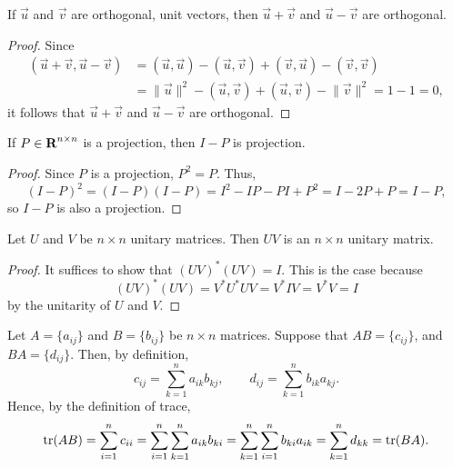 \documentclass{homework}
\begin{document}
	\maketitle
	
	\question If $\vec{u}$ and $\vec{v}$ are orthogonal, unit vectors, then $\vec{u} + \vec{v}$ and $\vec{u} - \vec{v}$ are orthogonal.
	
	\begin{proof}
		Since
		\begin{align*}
			(\vec{u}+\vec{v}, \vec{u} - \vec{v}) &= (\vec{u},\vec{u}) - (\vec{u}, \vec{v}) + (\vec{v},\vec{u}) - (\vec{v},\vec{v})\\
			&= \lVert \vec{u}\rVert^2 - (\vec{u}, \vec{v}) + (\vec{u}, \vec{v}) - \lVert \vec{v}\rVert^2 = 1-1 =0,
		\end{align*}
		it follows that $\vec{u} + \vec{v}$ and $\vec{u} - \vec{v}$ are orthogonal.
	\end{proof}
	
	\question If $P \in \textnormal{\bf R}^{n\times n}$ is a projection, then $I-P$ is projection.
	\begin{proof}
		Since $P$ is a projection, $P^2 = P$. Thus,
		\begin{equation*}
			(I-P)^2 = (I-P)(I-P) = I^2 - IP - PI + P^2 = I - 2P + P = I - P,
		\end{equation*}
		so $I-P$ is also a projection.
	\end{proof}
	
	\question Let $U$ and $V$ be $n\times n$ unitary matrices. Then $UV$ is an $n \times n$ unitary matrix.
	
	\begin{proof}
		It suffices to show that $(UV)^*(UV) = I$. This is the case because
		\begin{equation*}
			(UV)^*(UV) =V^*U^*UV = V^*IV = V^*V = I
		\end{equation*}
		by the unitarity of $U$ and $V$.
	\end{proof}
	
	\question Let $A = \{a_{ij}\}$ and $B = \{b_{ij}\}$ be $n \times n$ matrices. Suppose that $AB = \{c_{ij}\}$, and $BA = \{d_{ij}\}$. Then, by definition,
	\begin{equation*}
		c_{ij} = \sum_{k=1}^n a_{ik}b_{kj}, \qquad d_{ij} = \sum_{k=1}^n b_{ik}a_{kj}.
	\end{equation*} 
	Hence, by the definition of trace,
	\begin{equation*}
		\mathrm{tr}(AB) = \sum_{i=1}^n c_{ii} = \sum_{i=1}^n\sum_{k=1}^n a_{ik}b_{ki}= \sum_{k=1}^n\sum_{i=1}^nb_{ki}a_{ik} = \sum_{k=1}^nd_{kk} = \mathrm{tr}(BA).
	\end{equation*}
	
\end{document}
